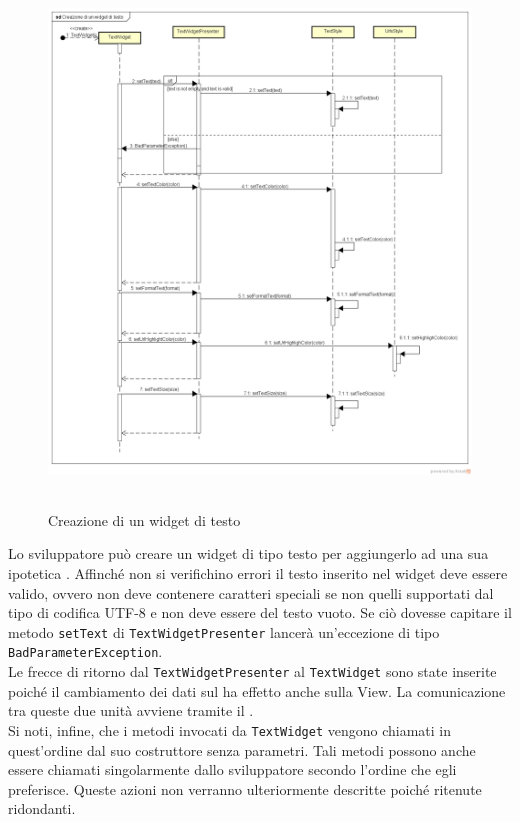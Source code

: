 \label{Creazione di un widget di testo}
\begin{figure}[H]
	\centering
	\includegraphics[width=16cm, height=14cm]{Sezioni/Diagrammi/SDK/Creazione di un widget di testo.png}
	\caption{Creazione di un widget di testo}
\end{figure}

Lo sviluppatore può creare un widget di tipo testo per aggiungerlo ad una sua ipotetica . Affinché non si verifichino errori il testo inserito nel widget deve essere valido, ovvero non deve contenere caratteri speciali se non quelli supportati dal tipo di codifica UTF-8 e non deve essere del testo vuoto. Se ciò dovesse capitare il metodo \texttt{setText} di \texttt{TextWidgetPresenter} lancerà un'eccezione di tipo \texttt{BadParameterException}. \\
Le frecce di ritorno dal \texttt{TextWidgetPresenter}  al \texttt{TextWidget} sono state inserite poiché il cambiamento dei dati sul  ha effetto anche sulla View. La comunicazione tra queste due unità avviene tramite il  . \\
Si noti, infine, che i metodi invocati da \texttt{TextWidget} vengono chiamati in quest'ordine dal suo costruttore senza parametri. Tali metodi possono anche essere chiamati singolarmente dallo sviluppatore secondo l'ordine che egli preferisce. Queste azioni non verranno ulteriormente descritte poiché ritenute ridondanti.

